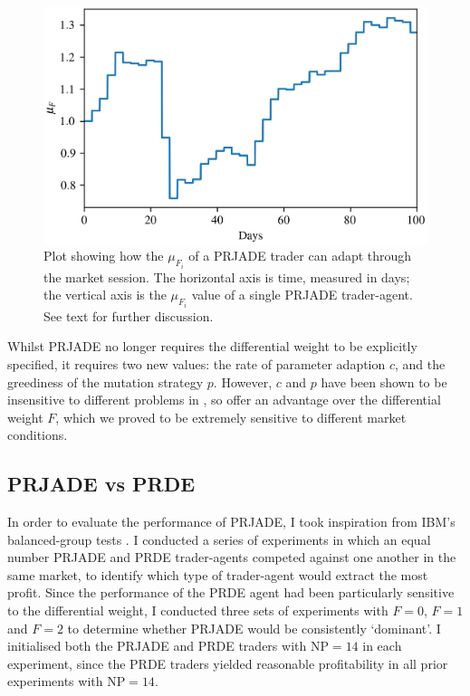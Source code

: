 \documentclass[conference]{IEEEtran}
\begin{document}
\begin{figure}[htbp]
    \centerline{\includegraphics[width=\columnwidth]{mu_F_2.0.png}}
    \caption{
        Plot showing how the $\mu_{F_i}$ of a PRJADE trader can adapt through the market session.
        The horizontal axis is time, measured in days; the vertical axis is the $\mu_{F_i}$ value of a single PRJADE trader-agent.
        See text for further discussion.
    }
    \label{mu_F}
\end{figure}

Whilst PRJADE no longer requires the differential weight to be explicitly specified, it requires two new values: the rate of parameter adaption $c$, and the greediness of the mutation strategy $p$.
However, $c$ and $p$ have been shown to be insensitive to different problems in \cite{ZhangSanderson}, so offer an advantage over the differential weight $F$, which we proved to be extremely sensitive to different market conditions. 

\subsection{PRJADE vs PRDE}

In order to evaluate the performance of PRJADE, I took inspiration from IBM's balanced-group tests \cite{TesauroDas}.
I conducted a series of experiments in which an equal number PRJADE and PRDE trader-agents competed against one another in the same market, to identify which type of trader-agent would extract the most profit.
Since the performance of the PRDE agent had been particularly sensitive to the differential weight, I conducted three sets of experiments with $F=0$, $F=1$ and $F=2$ to determine whether PRJADE would be consistently `dominant'.
I initialised both the PRJADE and PRDE traders with $\mathrm{NP}=14$ in each experiment, since the PRDE traders yielded reasonable profitability in all prior experiments with $\mathrm{NP}=14$.
\end{document}
